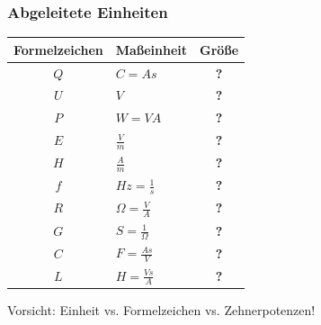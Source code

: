\begin{frame}
    \frametitle{Abgeleitete Einheiten}

    \begin{center}
    \footnotesize
    \begin{tabular}{|c|l|c|}\hline
        \textbf{Formelzeichen} & \textbf{Maßeinheit} & \textbf{Größe} \\ \hline \hline
        $Q$ & $C = As$                & \textbf{?} \\ \hline
        $U$ & $V$                     & \textbf{?} \\ \hline
        $P$ & $W = VA$                & \textbf{?} \\ \hline
        $E$ & $\frac{V}{m}$           & \textbf{?} \\ \hline
        $H$ & $\frac{A}{m}$           & \textbf{?} \\ \hline
        $f$ & $Hz = \frac{1}{s}$      & \textbf{?} \\ \hline
        $R$ & $\Omega = \frac{V}{A}$  & \textbf{?} \\ \hline
        $G$ & $S = \frac{1}{\Omega}$  & \textbf{?} \\ \hline
        $C$ & $F = \frac{As}{V}$      & \textbf{?} \\ \hline
        $L$ & $H = \frac{Vs}{A}$      & \textbf{?} \\ \hline
    \end{tabular}
    \end{center}

    Vorsicht: Einheit vs. Formelzeichen vs. Zehnerpotenzen!

\end{frame}

